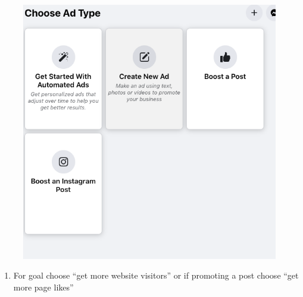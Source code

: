 \documentclass[]{book}
\providecommand{\tightlist}{%
  \setlength{\itemsep}{0pt}\setlength{\parskip}{0pt}}
\begin{document}
\begin{figure}
\centering
\includegraphics{images/lab_protocols/fb_ads/3.png}
\caption{}
\end{figure}

\begin{enumerate}
\def\labelenumi{\arabic{enumi}.}
\setcounter{enumi}{3}
\tightlist
\item
  For goal choose ``get more website visitors'' or if promoting a post choose ``get more page likes''
\end{enumerate}
\end{document}
